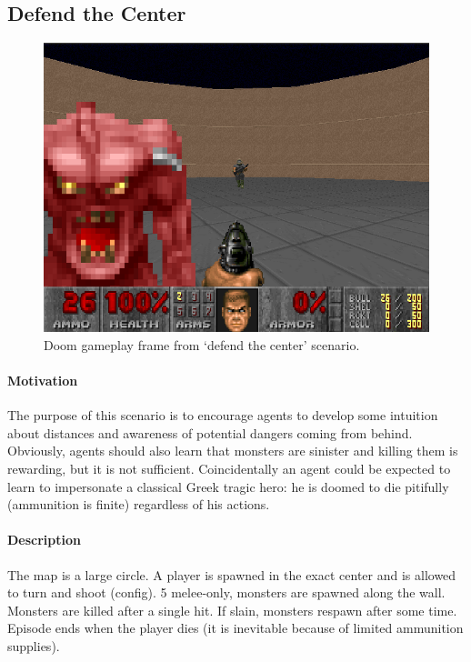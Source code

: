 \documentclass[english,bachelor,a4paper,twoside]{ppfcmthesis}
\begin{document}
	\subsection{Defend the Center}\label{subsec:defend_the_center}
		\begin{figure}
			\centering
			\includegraphics[scale=0.5]{defend_the_center.png}
			\caption{Doom gameplay frame from `defend the center' scenario.}\label{fig:defend_the_center}
		\end{figure}
		\paragraph{Motivation} 
			The purpose of this scenario is to encourage agents to develop some intuition about distances and awareness of potential dangers coming from behind. Obviously, agents should also learn that monsters are sinister and killing them is rewarding, but it is not sufficient. Coincidentally an agent could be expected to learn to impersonate a classical Greek tragic hero: he is doomed to die pitifully (ammunition is finite) regardless of his actions.

		\paragraph{Description}
			The map is a large circle. A player is spawned in the exact center and is allowed to turn and shoot (config). 5 melee-only, monsters are spawned along the wall. Monsters are killed after a single hit. If slain, monsters respawn after some time. Episode ends when the player dies (it is inevitable because of limited ammunition supplies).
\end{document}
